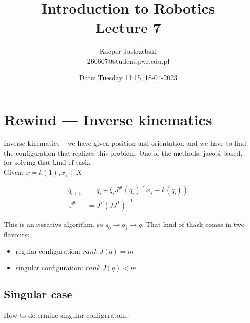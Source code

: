 \documentclass[12pt, a4paper]{extarticle}
\title{
	Introduction to Robotics \\
	\vspace{\baselineskip}
	\large
	\textbf{Lecture 7}
}
\author{
	Kacper Jastrzębski\\
	260607@student.pwr.edu.pl
}
\date{Date: Tuesday 11:15, 18-04-2023}
\begin{document}
	\maketitle
	\vspace{1.5cm}

	\tableofcontents

	\pagebreak

	\section{Rewind –– Inverse kinematics}

	Inverse kinematics -- we have given position and orientation and we have to find the configuration that realizes this problem. One of the methods, jacobi based, for solving that kind of task.\\

	Given: $x = k(1), x_f \in X$

	\begin{align}\label{key}
		q_{i+1} &= q_i + \xi_i J^\#(q_i)(x_f - k(q_i))\\
		J^\# &= J^T (JJ^T)^{-1}
	\end{align}

	This is an iterative algorithm, so $q_0 \rightarrow q_1 \rightarrow q$. That kind of thask comes in two flavours:
	\begin{itemize}
		\item regular configuration: $rank\; J(q) = m$
		\item singular configuration: $rank\; J(q) < m$
	\end{itemize}

	\subsection{Singular case}

	How to determine singular configuratoin:
\end{document}
